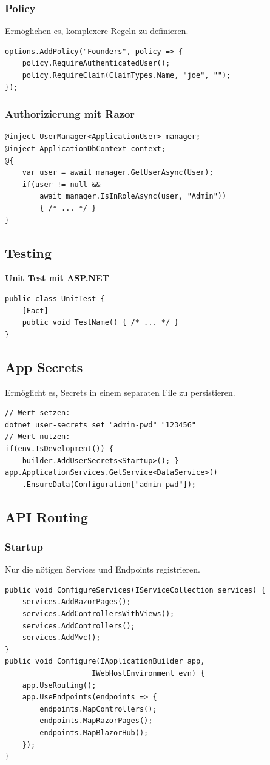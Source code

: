 \subsubsection{Policy}
Ermöglichen es, komplexere Regeln zu definieren.
\begin{lstlisting}
options.AddPolicy("Founders", policy => {
    policy.RequireAuthenticatedUser();
    policy.RequireClaim(ClaimTypes.Name, "joe", "");
});
\end{lstlisting}

\subsubsection{Authorizierung mit Razor}
\begin{lstlisting}
@inject UserManager<ApplicationUser> manager;
@inject ApplicationDbContext context;
@{
    var user = await manager.GetUserAsync(User);
    if(user != null &&
        await manager.IsInRoleAsync(user, "Admin"))
        { /* ... */ }
}
\end{lstlisting}

\subsection{Testing}
\textbf{Unit Test mit ASP.NET}
\begin{lstlisting}
public class UnitTest {
    [Fact]
    public void TestName() { /* ... */ }
}
\end{lstlisting}

\subsection{App Secrets}
Ermöglicht es, Secrets in einem separaten File zu persistieren.
\begin{lstlisting}
// Wert setzen:
dotnet user-secrets set "admin-pwd" "123456"
// Wert nutzen:
if(env.IsDevelopment()) {
    builder.AddUserSecrets<Startup>(); }
app.ApplicationServices.GetService<DataService>()
    .EnsureData(Configuration["admin-pwd"]);
\end{lstlisting}

\subsection{API Routing}
\subsubsection{Startup}
Nur die nötigen Services und Endpoints registrieren.
\begin{lstlisting}
public void ConfigureServices(IServiceCollection services) {
    services.AddRazorPages();
    services.AddControllersWithViews();
    services.AddControllers();
    services.AddMvc();
}
public void Configure(IApplicationBuilder app,
                    IWebHostEnvironment evn) {
    app.UseRouting();
    app.UseEndpoints(endpoints => {
        endpoints.MapControllers();
        endpoints.MapRazorPages();
        endpoints.MapBlazorHub();
    });
}
\end{lstlisting}

